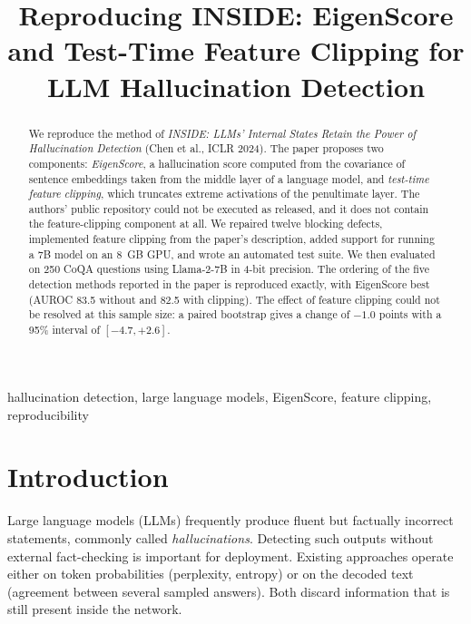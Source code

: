 \documentclass[conference]{IEEEtran}
\begin{document}
\title{Reproducing INSIDE: EigenScore and Test-Time Feature Clipping for LLM Hallucination Detection}
\author{
\and{}
\and{}}
\maketitle
\begin{abstract}
We reproduce the method of \emph{INSIDE: LLMs' Internal States Retain the Power of Hallucination Detection} (Chen et al., ICLR 2024). The paper proposes two components: \emph{EigenScore}, a hallucination score computed from the covariance of sentence embeddings taken from the middle layer of a language model, and \emph{test-time feature clipping}, which truncates extreme activations of the penultimate layer. The authors' public repository could not be executed as released, and it does not contain the feature-clipping component at all. We repaired twelve blocking defects, implemented feature clipping from the paper's description, added support for running a 7B model on an 8~GB GPU, and wrote an automated test suite. We then evaluated on 250 CoQA questions using Llama-2-7B in 4-bit precision. The ordering of the five detection methods reported in the paper is reproduced exactly, with EigenScore best (AUROC 83.5 without and 82.5 with clipping). The effect of feature clipping could not be resolved at this sample size: a paired bootstrap gives a change of $-1.0$ points with a 95\% interval of $[-4.7,+2.6]$.
\end{abstract}
\begin{IEEEkeywords}hallucination detection, large language models, EigenScore, feature clipping, reproducibility\end{IEEEkeywords}
\section{Introduction}
Large language models (LLMs) frequently produce fluent but factually incorrect statements, commonly called \emph{hallucinations}. Detecting such outputs without external fact-checking is important for deployment. Existing approaches operate either on token probabilities (perplexity, entropy) or on the decoded text (agreement between several sampled answers). Both discard information that is still present inside the network.
\end{document}
